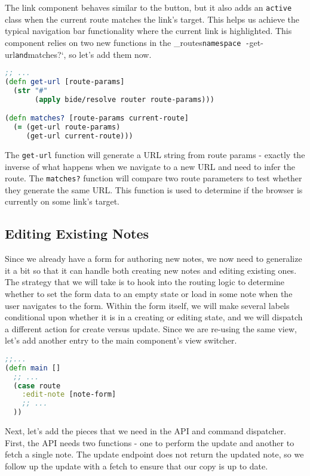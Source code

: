 \documentclass[10pt,twoside,openright]{memoir}
\begin{document}
The link component behaves similar to the button, but it also adds an
\texttt{active} class when the current route matches the link's target.
This helps us achieve the typical navigation bar functionality where the
current link is highlighted. This component relies on two new functions
in the \_routes\texttt{namespace\ -}get-url\texttt{and}matches?`, so
let's add them now.

\begin{lstlisting}[language=Clojure, caption={notes/routes.cljs}]
;; ...
(defn get-url [route-params]
  (str "#"
       (apply bide/resolve router route-params)))

(defn matches? [route-params current-route]
  (= (get-url route-params)
     (get-url current-route)))
\end{lstlisting}

The \texttt{get-url} function will generate a URL string from route
params - exactly the inverse of what happens when we navigate to a new
URL and need to infer the route. The \texttt{matches?} function will
compare two route parameters to test whether they generate the same URL.
This function is used to determine if the browser is currently on some
link's target.


\subsection{Editing Existing Notes}

Since we already have a form for authoring new notes, we now need to
generalize it a bit so that it can handle both creating new notes and
editing existing ones. The strategy that we will take is to hook into
the routing logic to determine whether to set the form data to an empty
state or load in some note when the user navigates to the form. Within
the form itself, we will make several labels conditional upon whether it
is in a creating or editing state, and we will dispatch a different
action for create versus update. Since we are re-using the same view,
let's add another entry to the main component's view switcher.

\begin{lstlisting}[language=Clojure, caption={notes/ui/main.cljs}]
;;...
(defn main []
  ;; ...
  (case route
    :edit-note [note-form]
    ;; ...
  ))
\end{lstlisting}

Next, let's add the pieces that we need in the API and command
dispatcher. First, the API needs two functions - one to perform the
update and another to fetch a single note. The update endpoint does not
return the updated note, so we follow up the update with a fetch to
ensure that our copy is up to date.
\end{document}
